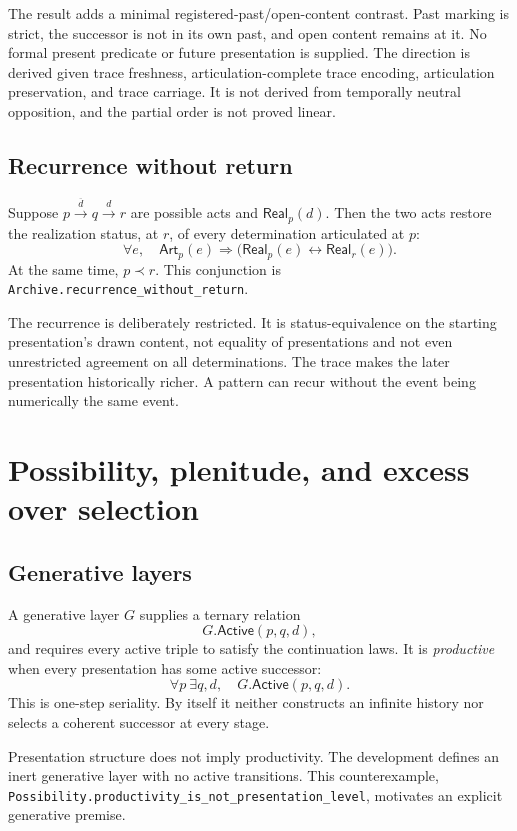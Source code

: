 \documentclass[11pt]{article}
\theoremstyle{definition}
\theoremstyle{remark}
\newcommand{\lean}[1]{\nolinkurl{#1}}
\newcommand{\Art}{\mathsf{Art}}
\newcommand{\Real}{\mathsf{Real}}
\newcommand{\Active}{\mathsf{Active}}
\newcommand{\negd}[1]{\overline{#1}}
\begin{document}
The result adds a minimal registered-past/open-content contrast. Past marking is
strict, the successor is not in its own past, and open content remains at it.
No formal present predicate or future presentation is supplied. The direction
is derived given trace freshness, articulation-complete trace encoding, articulation
preservation, and trace carriage. It is not derived from temporally neutral
opposition, and the partial order is not proved linear.

\subsection{Recurrence without return}

Suppose \(p\xrightarrow{\negd d}q\xrightarrow{d}r\) are possible acts and
\(\Real_p(d)\). Then the two acts restore the realization status, at \(r\), of
every determination articulated at \(p\):
\[
  \forall e,\quad
  \Art_p(e)\Rightarrow
  \bigl(\Real_p(e)\leftrightarrow\Real_r(e)\bigr).
\]
At the same time, \(p\prec r\). This conjunction is
\lean{Archive.recurrence_without_return}.

The recurrence is deliberately restricted. It is status-equivalence on the
starting presentation's drawn content, not equality of presentations and not
even unrestricted agreement on all determinations. The trace makes the later
presentation historically richer. A pattern can recur without the event
being numerically the same event.

\section{Possibility, plenitude, and excess over selection}

\subsection{Generative layers}

A generative layer \(G\) supplies a ternary relation
\[
  G.\Active(p,q,d),
\]
and requires every active triple to satisfy the continuation laws. It is
\emph{productive} when every presentation has some active successor:
\[
  \forall p\ \exists q,d,\quad G.\Active(p,q,d).
\]
This is one-step seriality. By itself it neither constructs an infinite
history nor selects a coherent successor at every stage.

Presentation structure does not imply productivity. The development defines
an inert generative layer with no active transitions. This counterexample,
\lean{Possibility.productivity_is_not_presentation_level}, motivates an
explicit generative premise.
\end{document}
